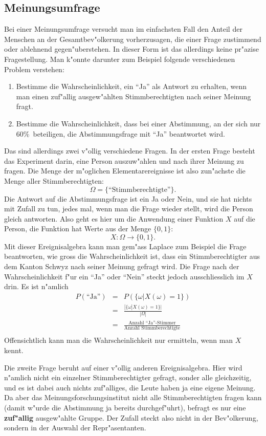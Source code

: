 \subsection{Meinungsumfrage}
Bei einer Meinungsumfrage versucht man im einfachsten Fall den Anteil
der Menschen an der Gesamtbev"olkerung vorherzusagen, die einer
Frage zustimmend oder ablehnend gegen"uberstehen. In dieser Form
ist das allerdings keine pr"azise Fragestellung.
Man k"onnte darunter zum Beispiel folgende verschiedenen Problem
verstehen:
\begin{enumerate}
\item Bestimme die Wahrscheinlichkeit, ein ``Ja'' als Antwort zu
erhalten, wenn man einen zuf"allig ausgew"ahlten Stimmberechtigten
nach seiner Meinung fragt.
\item Bestimme die Wahrscheinlichkeit, dass bei einer Abstimmung,
an der sich nur 60\%\ beteiligen, die Abstimmungsfrage mit ``Ja''
beantwortet wird.
\end{enumerate}
Das sind allerdings zwei v"ollig verschiedene Fragen. In der ersten
Frage besteht das Experiment darin, eine Person auszuw"ahlen und nach
ihrer Meinung zu fragen. Die Menge der m"oglichen Elementarereignisse
ist also zun"achste die Menge aller Stimmberechtigten:
\[
\Omega=\{\text{``Stimmberechtigte''}\}.
\]
Die Antwort auf die Abstimmungsfrage ist ein Ja oder Nein, und sie
hat nichts mit Zufall zu tun, jedes mal, wenn man die Frage wieder
stellt, wird die Person gleich antworten. Also geht es hier um
die Anwendung einer Funktion $X$ auf die Person, die Funktion hat
Werte aus der Menge $\{0,1\}$:
\[
X\colon \Omega\to\{0,1\}.
\]
Mit dieser Ereignisalgebra kann man gem"ass Laplace zum Beispiel die
Frage beantworten,
wie gross die Wahrscheinlichkeit ist, dass ein Stimmberechtigter aus
dem Kanton Schwyz nach seiner Meinung gefragt wird.
Die Frage nach der Wahrscheinlichkeit f"ur ein ``Ja'' oder ``Nein''
steckt jedoch ausschliesslich im $X$ drin. Es ist n"amlich
\begin{eqnarray*}
P(\text{``Ja''})&=&P(\{\omega|X(\omega)=1\})\\
&=&\frac{|\{\omega|X(\omega)=1\}|}{|\Omega|}\\
&=&\frac{\text{Anzahl ``Ja''-Stimmer}}{\text{Anzahl Stimmberechtigte}}\\
\end{eqnarray*}
Offensichtlich kann man die Wahrscheinlichkeit nur ermitteln, wenn
man $X$ kennt.

Die zweite Frage beruht auf einer v"ollig anderen Ereignisalgebra. Hier
wird n"amlich nicht ein einzelner Stimmberechtigter gefragt, sonder
alle gleichzeitig, und es ist dabei auch nichts zuf"alliges, die
Leute haben ja eine eigene Meinung. Da aber das Meinungsforschungsinstitut
nicht alle Stimmberechtigten fragen kann (damit w"urde die Abstimmung
ja bereits durchgef"uhrt), befragt es nur eine {\bf zuf"allig} ausgew"ahlte
Gruppe. Der Zufall steckt also nicht in der Bev"olkerung, sondern in der
Auswahl der Repr"asentanten.

